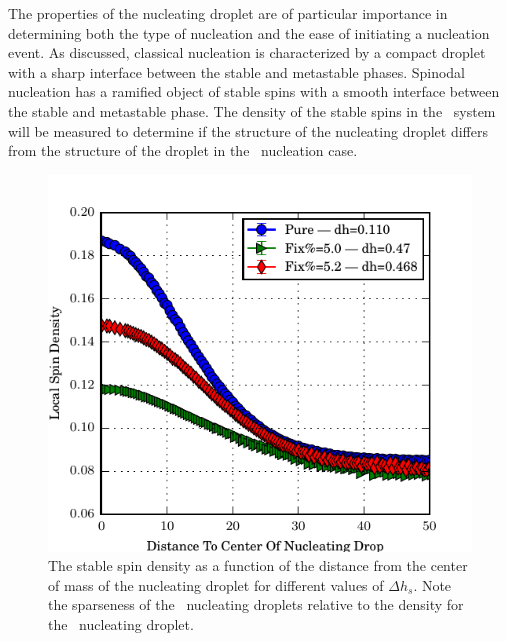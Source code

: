 The properties of the  nucleating droplet are of particular importance in determining both the type of nucleation and the ease of initiating a nucleation event. As discussed, classical nucleation is characterized by a compact droplet with a sharp interface between the stable and metastable phases. Spinodal nucleation has a ramified object of stable spins with a smooth interface between the stable and metastable phase. The density of the stable spins in the \het\ system will be measured to determine if the structure of the nucleating droplet differs from the structure of the droplet in the \homo\ nucleation case.
\begin{figure}[!h]
 \centering
 \includegraphics[scale=1.05]{Figures/density/density_fix_spinodal.pdf}
 \caption{The stable spin density as a function of the distance from the center of mass of the nucleating droplet for different values of $\Delta h_s$. Note the sparseness of the \het\ nucleating droplets relative to the density for the \homo\ nucleating droplet. }
 \label{fig:densityfixdh}
\end{figure}%
